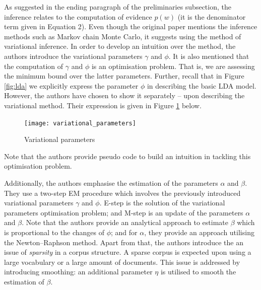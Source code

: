 \documentclass{mprop}
\begin{document}
\par As suggested in the ending paragraph of the preliminaries subsection, the inference relates to the computation of evidence $p(w)$ (it is the denominator term given in Equation 2). Even though the original paper mentions the inference methods such as Markov chain Monte Carlo, it suggests using the method of variational inference. In order to develop an intuition over the method, the authors introduce the variational parameters $\gamma$ and $\phi$. It is also mentioned that the computation of $\gamma$ and $\phi$ is an optimisation problem. That is, we are assessing the minimum bound over the latter parameters. Further, recall that in Figure \ref{fig:lda} we explicitly express the parameter $\phi$ in describing the basic LDA model. However, the authors have chosen to show it separately -- upon describing the variational method. Their expression is given in Figure \ref{fig:var_par} below.
\begin{figure}[H]
  \centering
  \texttt{[image: variational\_parameters]}
  \caption{Variational parameters}
  \label{fig:var_par}
\end{figure}
Note that the authors provide pseudo code to build an intuition in tackling this optimisation problem.

\par Additionally, the authors emphasise the estimation of the parameters $\alpha$ and $\beta$. They use a two-step EM procedure which involves the previously introduced variational parameters $\gamma$ and $\phi$. E-step is the solution of the variational parameters optimisation problem; and M-step is an update of the parameters $\alpha$ and $\beta$. Note that the authors provide an analytical approach to estimate $\beta$ which is proportional to the changes of $\phi$; and for $\alpha$, they provide an approach utilising the Newton--Raphson method. Apart from that, the authors introduce the an issue of \textit{sparsity} in a corpus structure. A sparse corpus is expected upon using a large vocabulary or a large amount of documents. This issue is addressed by introducing smoothing: an additional parameter $\eta$ is utilised to smooth the estimation of $\beta$. 
\end{document}
